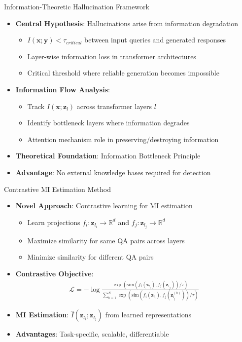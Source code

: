 \documentclass[aspectratio=169]{beamer}
\begin{document}
\begin{frame}{Information-Theoretic Hallucination Framework}
\begin{itemize}
    \item \textbf{Central Hypothesis}: Hallucinations arise from information degradation
    \begin{itemize}
        \item $I(\mathbf{x}; \mathbf{y}) < \tau_{critical}$ between input queries and generated responses
        \item Layer-wise information loss in transformer architectures
        \item Critical threshold where reliable generation becomes impossible
    \end{itemize}
    \item \textbf{Information Flow Analysis}:
    \begin{itemize}
        \item Track $I(\mathbf{x}; \mathbf{z}_l)$ across transformer layers $l$
        \item Identify bottleneck layers where information degrades
        \item Attention mechanism role in preserving/destroying information
    \end{itemize}
    \item \textbf{Theoretical Foundation}: Information Bottleneck Principle
    \item \textbf{Advantage}: No external knowledge bases required for detection
\end{itemize}
\end{frame}

\begin{frame}{Contrastive MI Estimation Method}
\begin{itemize}
    \item \textbf{Novel Approach}: Contrastive learning for MI estimation
    \begin{itemize}
        \item Learn projections $f_i: \mathbf{z}_{l_i} \rightarrow \mathbb{R}^d$ and $f_j: \mathbf{z}_{l_j} \rightarrow \mathbb{R}^d$
        \item Maximize similarity for same QA pairs across layers
        \item Minimize similarity for different QA pairs
    \end{itemize}
    \item \textbf{Contrastive Objective}:
    \begin{align}
        \mathcal{L} = -\log \frac{\exp(\text{sim}(f_i(\mathbf{z}_{l_i}), f_j(\mathbf{z}_{l_j})) / \tau)}{\sum_{k=1}^{N} \exp(\text{sim}(f_i(\mathbf{z}_{l_i}), f_j(\mathbf{z}_{l_j}^{(k)})) / \tau)}
    \end{align}
    \item \textbf{MI Estimation}: $\hat{I}(\mathbf{z}_{l_i}; \mathbf{z}_{l_j})$ from learned representations
    \item \textbf{Advantages}: Task-specific, scalable, differentiable
\end{itemize}
\end{frame}
\end{document}
